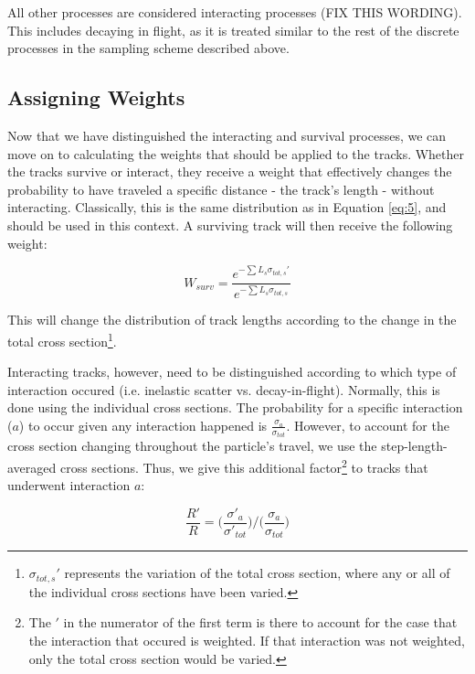 \documentclass[12pt]{article}
\begin{document}
All other processes are considered interacting processes (FIX THIS WORDING). This includes decaying in flight, as it is treated similar to the rest of the discrete processes in the sampling scheme described above. 

\subsection{Assigning Weights}

Now that we have distinguished the interacting and survival processes, we can move on to calculating the weights that should be applied to the tracks. Whether the tracks survive or interact, they receive a weight that effectively changes the probability to have traveled a specific distance - the track's length - without interacting. Classically, this is the same distribution as in Equation \ref{eq:5}, and should be used in this context. A surviving track will then receive the following weight: 

\begin{equation}\label{eq:surv_weight}
  W_{surv} = \frac{e^{-\sum L_s  \sigma_{tot,s}'}}{e^{-\sum L_s  \sigma_{tot,s}}}
\end{equation}

This will change the distribution of track lengths according to the change in the total cross section\footnote{$\sigma_{tot,s}'$ represents the variation of the total cross section, where any or all of the individual cross sections have been varied.}.

Interacting tracks, however, need to be distinguished according to which type of interaction occured (i.e. inelastic scatter vs. decay-in-flight). Normally, this is done using the individual cross sections. The probability for a specific interaction ($a$) to occur given any interaction happened is $\frac{\sigma_a}{\sigma_{tot}}$. However, to account for the cross section changing throughout the particle's travel, we use the step-length-averaged cross sections. Thus, we give this additional factor\footnote{The $'$ in the numerator of the first term is there to account for the case that the interaction that occured is weighted. If that interaction was not weighted, only the total cross section would be varied.} to tracks that underwent interaction $a$:

\begin{equation}
\frac{R'}{R} = \big(\frac{\sigma'_a}{\sigma'_{tot}}\big)/\big(\frac{\sigma_a}{\sigma_{tot}}\big)
\end{equation}
\end{document}
